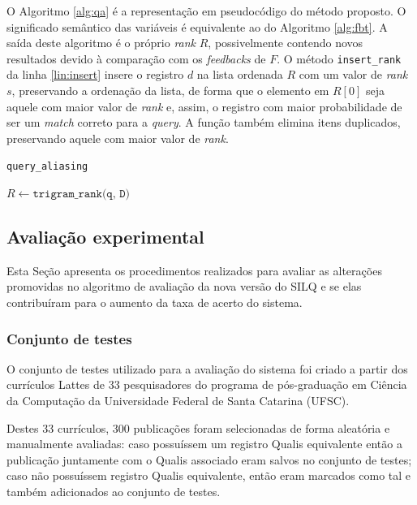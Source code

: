 \documentclass[12pt]{article}
\begin{document}
O Algoritmo \ref{alg:qa} é a representação em pseudocódigo do método proposto. O significado semântico das variáveis é equivalente ao do Algoritmo \ref{alg:fbt}. A saída deste algoritmo é o próprio \textit{rank} $R$, possivelmente contendo novos resultados devido à comparação com os \textit{feedbacks} de $F$. O método \texttt{insert\_rank} da linha \ref{lin:insert} insere o registro $d$ na lista ordenada $R$ com um valor de \textit{rank} $s$, preservando a ordenação da lista, de forma que o elemento em $R[0]$ seja aquele com maior valor de \textit{rank} e, assim, o registro com maior probabilidade de ser um \textit{match} correto para a \textit{query}. A função também elimina itens duplicados, preservando aquele com maior valor de \textit{rank}.

\begin{algorithm}
\caption{\texttt{query\_aliasing}}
\label{alg:qa}
\LinesNumbered
{}
\SetAlgoLined
{}

$R \gets \texttt{trigram\_rank(q, D)}$

 \label{li:sum-zero-begin}
\end{algorithm}

\subsection{Avaliação experimental} \label{sec:validation}

Esta Seção apresenta os procedimentos realizados para avaliar as alterações promovidas no algoritmo de avaliação da nova versão do SILQ e se elas contribuíram para o aumento da taxa de acerto do sistema.

\subsubsection{Conjunto de testes}

O conjunto de testes utilizado para a avaliação do sistema foi criado a partir dos currículos Lattes de 33 pesquisadores do programa de pós-graduação em Ciência da Computação da Universidade Federal de Santa Catarina (UFSC).

Destes 33 currículos, 300 publicações foram selecionadas de forma aleatória e manualmente avaliadas: caso possuíssem um registro Qualis equivalente então a publicação juntamente com o Qualis associado eram salvos no conjunto de testes; caso não possuíssem registro Qualis equivalente, então eram marcados como tal e também adicionados ao conjunto de testes.
\end{document}

